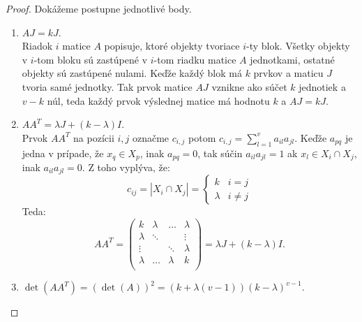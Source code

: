 \begin{proof}
Dokážeme postupne jednotlivé body.
\begin{enumerate}
	\item $A J = k J$. \label{itemA} \\
	Riadok $i$ matice $A$ popisuje, ktoré objekty tvoriace $i$-ty blok. Všetky objekty v $i$-tom bloku sú zastúpené v $i$-tom riadku matice $A$ jednotkami, ostatné objekty sú zastúpené nulami. Keďže každý blok má $k$ prvkov a maticu $J$ tvoria samé jednotky. Tak prvok matice $A J$ vznikne ako súčet $k$ jednotiek a $v - k$ núl, teda každý prvok výslednej matice má hodnotu $k$ a $A J = k J$.

	\item $A A^T = \lambda J + (k - \lambda) I$. \label{itemB} \\
	Prvok $A A^T$ na pozícii $i, j$ označme $c_{i,j}$ potom $c_{i,j} = \sum\limits_{l=1}^{v} a_{il} a_{jl}$. Keďže $a_{pq}$ je jedna v prípade, že $x_q \in X_p$, inak $a_{pq} = 0$, tak súčin $a_{il} a_{jl} = 1$ ak $x_l \in X_i \cap X_j$, inak $a_{il} a_{jl} = 0$. Z toho vyplýva, že:
	\begin{equation*}
		c_{ij} = |X_i \cap X_j| = \begin{cases}
					k               & i = j\\
					\lambda         & i \neq j
				\end{cases}
	\end{equation*}
	Teda:
	\begin{equation*}
		A A^T = 
		\begin{pmatrix}
		k & \lambda & \dots & \lambda \\
		\lambda & \ddots & & \vdots \\
		\vdots &  & \ddots & \lambda \\
		\lambda & \dots & \lambda & k \\
		\end{pmatrix} =  \lambda J + (k - \lambda) I.
	\end{equation*}

	\item $\det(A A^T) = (\det(A))^2 = (k + \lambda (v - 1)) (k - \lambda)^{v-1}$. \label{itemC} \\


\end{enumerate}
\end{proof}
